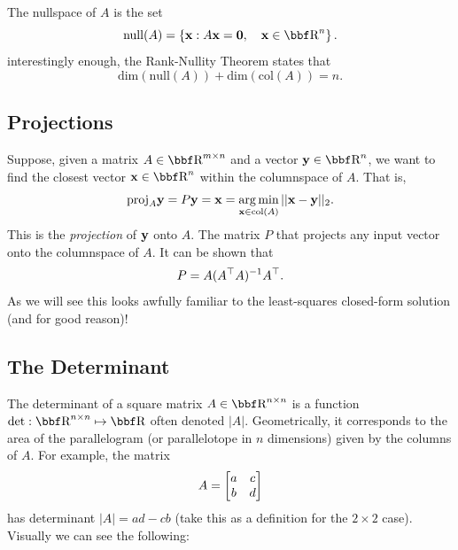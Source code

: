 \documentclass{article}
\begin{document}
The nullspace of $A$ is the set
\[
    \mathrm{null}(A) = \left\{ \xx : A\xx = \0,\quad \xx\in\RR^n \right\}.
\]
interestingly enough, the Rank-Nullity Theorem states that
\[
    \mathrm{dim}(\mathrm{null}(A)) + \mathrm{dim}(\mathrm{col}(A)) = n.
\]

\subsection{Projections}

Suppose, given a matrix $A\in\RR^{m\times n}$ and a vector $\yy\in\RR^n$,
we want to find the closest vector $\xx\in\RR^n$ within the columnspace
of $A$. That is,
\[
    \mathrm{proj}_A {\bf y} = P{\bf y} = {\bf x} = \operatorname*{arg\,min}_{{\bf x}\in\mathrm{col}(A)} ||{\bf x}-{\bf y}||_2.
\]
This is the \textit{projection} of ${\bf y}$ onto $A$. The matrix $P$ that projects
any input vector onto the columnspace of $A$. It can be shown that
\[
    P = A(A^\top A)^{-1}A^\top.
\]
As we will see this looks awfully familiar to the least-squares closed-form
solution (and for good reason)!

\subsection{The Determinant}

The determinant of a square matrix $A\in\RR^{n\times n}$ is a function
$\det: \RR^{n\times n} \mapsto \RR$ often denoted $|A|$. Geometrically,
it corresponds to the area of the parallelogram (or parallelotope in
$n$ dimensions) given by the columns of $A$. For example, the matrix
\[
    A = \begin{bmatrix} a&c\\b&d \end{bmatrix}
\]
has determinant $|A| = ad-cb$ (take this as a definition for the $2\times2$
case). Visually we can see the following:
\begin{center}
\end{center}
\end{document}
